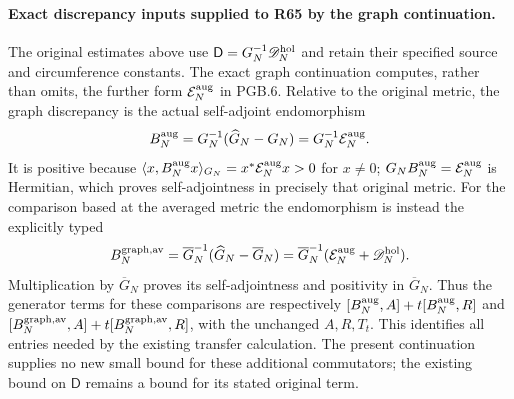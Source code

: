 \paragraph{Exact discrepancy inputs supplied to R65 by the graph continuation.}
The original estimates above use
$\mathsf D=G_N^{-1}\mathscr D_N^{\rm hol}$ and retain their
specified source and circumference constants. The exact graph
continuation computes, rather than omits, the further form
$\mathcal E_N^{\rm aug}$ in PGB.6. Relative to the original
metric, the graph discrepancy is the actual self-adjoint
endomorphism
\[
 B_N^{\rm aug}=G_N^{-1}(\widehat G_N-G_N)
             =G_N^{-1}\mathcal E_N^{\rm aug}.
\]
It is positive because
$\langle x,B_N^{\rm aug}x\rangle_{G_N}
=x^*\mathcal E_N^{\rm aug}x>0$ for $x\ne0$;
$G_NB_N^{\rm aug}=\mathcal E_N^{\rm aug}$ is Hermitian,
which proves self-adjointness in precisely that original metric.
For the comparison based at the averaged metric the endomorphism
is instead the explicitly typed
\[
 B_N^{\rm graph,av}
   =\overline G_N^{-1}(\widehat G_N-\overline G_N)
   =\overline G_N^{-1}
        (\mathcal E_N^{\rm aug}+\mathscr D_N^{\rm hol}).
\]
Multiplication by $\overline G_N$ proves its self-adjointness
and positivity in $\overline G_N$. Thus the generator terms
for these comparisons are respectively
$[B_N^{\rm aug},A]+t[B_N^{\rm aug},R]$ and
$[B_N^{\rm graph,av},A]+t[B_N^{\rm graph,av},R]$,
with the unchanged $A,R,T_t$. This identifies all entries
needed by the existing transfer calculation. The present
continuation supplies no new small bound for these additional
commutators; the existing bound on $\mathsf D$ remains a bound
for its stated original term.


